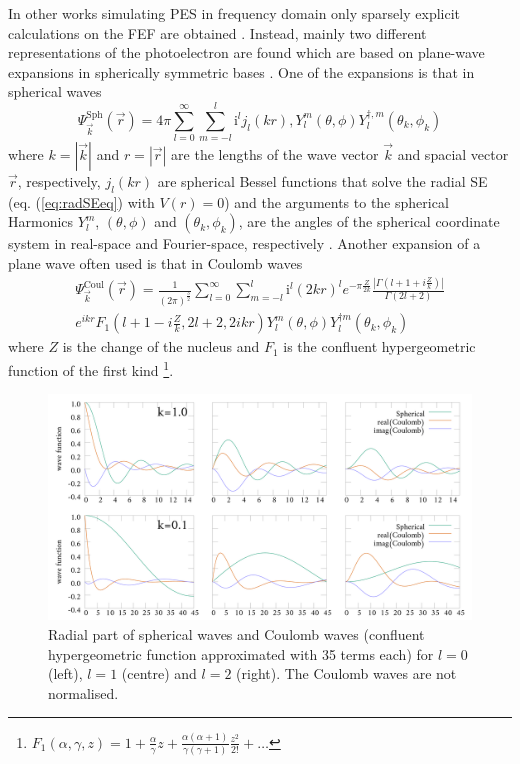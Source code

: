 In other works simulating PES in frequency domain only sparsely explicit calculations on the FEF are obtained \cite{ContOrb,H2pDeCleva}.
Instead, mainly two different representations of the photoelectron are found which are based on plane-wave expansions in spherically symmetric bases \cite{ezDyson,DO_TDDFT,do_modCoul}.
One of the expansions is that in spherical waves \cite{Lifschitz}
\begin{equation} \label{eq:spherWave}
\Psi^\text{Sph}_{\vec{k}}(\vec{r})=4\pi
\sum_{l=0}^\infty \sum_{m=-l}^l \text{i}^l j_l\left(kr\right), Y_l^m\left(\theta, \phi\right) Y^{\dagger,m}_l\left(\theta_k, \phi_k\right)
\end{equation}
where $k=|\vec{k}|$ and $r=|\vec{r}|$ are the lengths of the wave vector $\vec{k}$ and spacial vector $\vec{r}$, respectively, $j_l(kr)$ are spherical Bessel functions that solve the radial SE (eq. (\ref{eq:radSEeq}) with $V(r)=0$) and the arguments to the spherical Harmonics $Y_l^m$, $(\theta,\phi)$ and $(\theta_k,\phi_k)$, are the angles of the spherical coordinate system in real-space and Fourier-space, respectively \cite{ezDyson}.
Another expansion of a plane wave often used is that in Coulomb waves
\begin{multline} \label{eq:CoulWave}
\Psi^\text{Coul}_{\vec{k}}(\vec{r})=\frac{1}{(2\pi)^{\frac{3}{2}}}
\sum_{l=0}^\infty \sum_{m=-l}^l \text{i}^l (2kr)^l e^{-\pi\frac{Z}{2k}} \frac{|\Gamma(l+1+i\frac{Z}{k})|}{\Gamma(2l+2)} \\
e^{ikr} F_1(l+1-i\frac{Z}{k}, 2l+2, 2ikr) 
Y_l^m\left(\theta, \phi\right) Y^{\dagger m}_l\left(\theta_k, \phi_k\right)
\end{multline}
where $Z$ is the change of the nucleus and $F_1$ is the confluent hypergeometric function of the first kind \cite{do_modCoul,ColWave} \footnote{$F_1(\alpha,\gamma,z)=1+\frac{\alpha}{\gamma}z + \frac{\alpha (\alpha+1)}{\gamma (\gamma+1)} \frac{z^2}{2!}+\hdots $}.
\begin{figure}
\includegraphics[width=\textwidth]{Figures/RBF/RadialPart}
\caption{Radial part of spherical waves and Coulomb waves (confluent hypergeometric function approximated with 35 terms each) for $l=0$ (left), $l=1$ (centre) and $l=2$ (right).
The Coulomb waves are not normalised.}
\label{fig:RadFun}
\end{figure}

